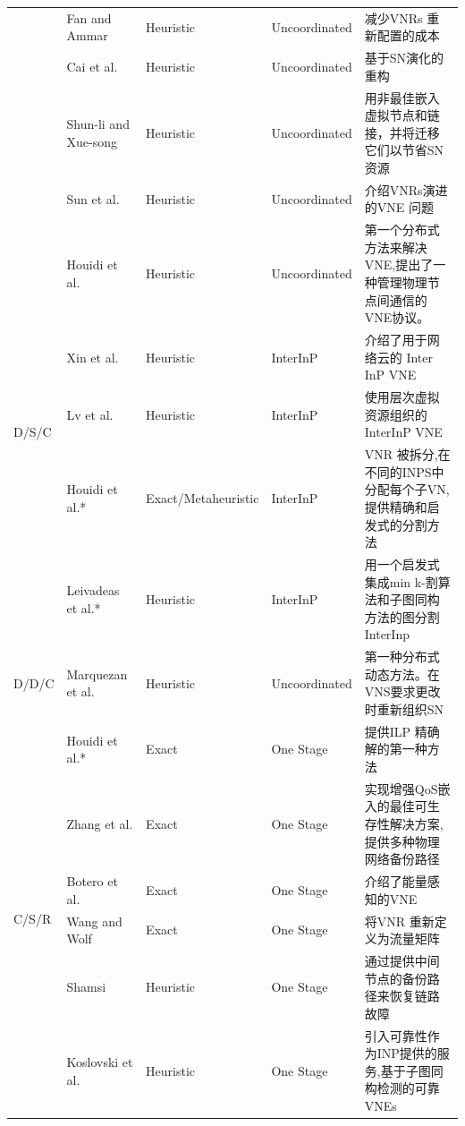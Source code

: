 \begin{longtable}[h]{@{}lm{}m{}m{}m{}}
 & Fan and Ammar  \cite{fan2006dynamic}  & Heuristic & Uncoordinated & 减少VNRs 重新配置的成本\\
 & Cai et al.  \cite{cai2010virtual}  & Heuristic & Uncoordinated & 基于SN演化的重构\\
 & Shun-li and Xue-song  \cite{zhang2011novel}  & Heuristic & Uncoordinated & 用非最佳嵌入虚拟节点和链接，并将迁移它们以节省SN资源\\
 & Sun et al.  \cite{sun2013cost}  & Heuristic & Uncoordinated & 介绍VNRs演进的VNE 问题
\\
\hline
\multirow{5}{*}{D/S/C} & Houidi et al.  \cite{houidi2008distributed,houidi2008distributed}  & Heuristic & Uncoordinated & 第一个分布式方法来解决VNE,提出了一种管理物理节点间通信的VNE协议。\\
 & Xin et al.  \cite{xin2011embedding}  & Heuristic & InterInP & 介绍了用于网络云的 Inter InP VNE\\
 & Lv et al.  \cite{lv2010virtual}  & Heuristic & InterInP & 使用层次虚拟资源组织的InterInP VNE\\
 & Houidi et al.*  \cite{houidi2011virtual}  & Exact/Metaheuristic & InterInP & VNR 被拆分,在不同的INPS中分配每个子VN,提供精确和启发式的分割方法\\
 & Leivadeas et al.*  \cite{leivadeas2013efficient}  & Heuristic & InterInP & 用一个启发式集成min k-割算法和子图同构方法的图分割InterInp
\\
\hline
\multirow{1}{*}{D/D/C} & Marquezan et al.  \cite{marquezan2010distributed}  & Heuristic  & Uncoordinated & 第一种分布式动态方法。在VNS要求更改时重新组织SN\\
\hline
\multirow{31}{*}{C/S/R} & Houidi et al.*  \cite{houidi2011virtual}  & Exact & One Stage & 提供ILP 精确解的第一种方法\\
 & Zhang et al.  \cite{zhang2011overlay}  & Exact & One Stage & 实现增强QoS嵌入的最佳可生存性解决方案,提供多种物理网络备份路径\\
 & Botero et al.  \cite{botero2012energy}  & Exact & One Stage & 介绍了能量感知的VNE\\
 & Wang and Wolf  \cite{wang2012virtual}  & Exact & One Stage & 将VNR 重新定义为流量矩阵 \\
 & Shamsi\cite{shamsi2007qosmapp,shamsi2008efficient,shamsi2009qosmap}  & Heuristic & One Stage & 通过提供中间节点的备份路径来恢复链路故障\\
 & Koslovski et al.  \cite{koslovski2010reliability}  & Heuristic & One Stage & 引入可靠性作为INP提供的服务,基于子图同构检测的可靠VNEs\\

\end{longtable}
